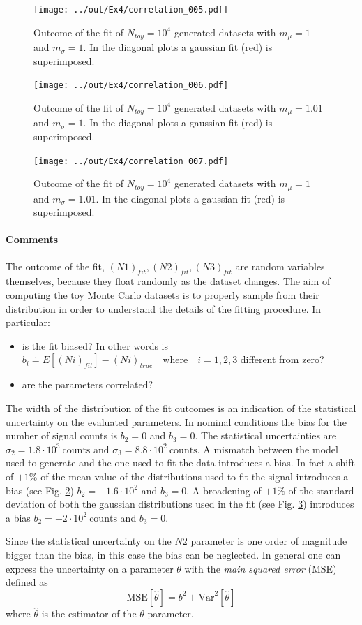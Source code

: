 \documentclass[10pt, oneside]{article}   	%
\begin{document}
\begin{figure}[h]
    \centering
    \texttt{[image: ../out/Ex4/correlation\_005.pdf]}
    \caption{Outcome of the fit of $N_{toy} = 10^4$ generated datasets with $m_\mu = 1$ and $m_\sigma = 1$. In the diagonal plots a gaussian fit (red) is superimposed.}
    \label{fig:correlation_000}
\end{figure}
\begin{figure}[h]
    \centering
    \texttt{[image: ../out/Ex4/correlation\_006.pdf]}
    \caption{Outcome of the fit of $N_{toy} = 10^4$ generated datasets with $m_\mu = 1.01$ and $m_\sigma = 1$. In the diagonal plots a gaussian fit (red) is superimposed.}
    \label{fig:correlation_001}
\end{figure}
\begin{figure}[h]
    \centering
    \texttt{[image: ../out/Ex4/correlation\_007.pdf]}
    \caption{Outcome of the fit of $N_{toy} = 10^4$ generated datasets with $m_\mu = 1$ and $m_\sigma = 1.01$. In the diagonal plots a gaussian fit (red) is superimposed.}
    \label{fig:correlation_002}
\end{figure}



\paragraph{Comments}
The outcome of the fit, $(N1)_{fit}, (N2)_{fit}, (N3)_{fit}$ are random variables themselves, because they float randomly as the dataset changes. The aim of computing the toy Monte Carlo datasets is to properly sample from their distribution in order to understand the details of the fitting procedure. In particular:
\begin{itemize}
\item is the fit biased? In other words is $ b_i \doteq E[(Ni)_{fit}] - (Ni)_{true} \quad \mathrm{where} \quad i = 1,2,3$ different from zero?
\item are the parameters correlated?
\end{itemize}
The width of the distribution of the fit outcomes is an indication of the statistical uncertainty on the evaluated parameters.
In nominal conditions the bias for the number of signal counts is $b_2 = 0$ and $b_3 = 0$.
The statistical uncertainties are $\sigma_2 = 1.8 \cdot 10^3 \:\mathrm{counts} $ and $\sigma_3 = 8.8 \cdot 10^2 \:\mathrm{counts}$.
A mismatch between the model used to generate and the one used to fit the data introduces a bias. In fact a shift of $+1 \%$ of the mean value of the distributions used to fit the signal introduces a bias (see Fig. \ref{fig:correlation_001}) $b_2 = -1.6 \cdot 10^2$ and $b_3 = 0$.
A broadening of $+1\%$ of the standard deviation of both the gaussian distributions used in the fit (see Fig. \ref{fig:correlation_002}) introduces a bias $b_2 = +2 \cdot 10^2 \:\mathrm{counts}$ and $b_3 = 0$.

Since the statistical uncertainty on the $N2$ parameter is one order of magnitude bigger than the bias, in this case the bias can be neglected. In general one can express the uncertainty on a parameter $\theta$ with the \textit{main squared error} (MSE) defined as
$$ \mathrm{MSE}[\hat{\theta}] = b^2 + \mathrm{Var}^2[\hat{\theta}]$$
where $\hat{\theta}$ is the estimator of the $\theta$ parameter.
\end{document}
